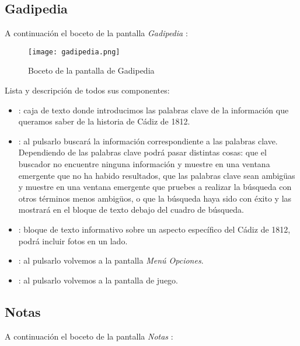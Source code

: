             \newpage
            \subsection{Gadipedia}
            A continuación el boceto de la pantalla \emph{Gadipedia} :
            
            \begin{figure}[H] 
                \begin{center}
                    \texttt{[image: gadipedia.png]}
                \end{center}
                \caption{Boceto de la pantalla de Gadipedia}
                \label{fig:gadipedia}
            \end{figure}
            
            Lista y descripción de todos sus componentes:
            \begin{itemize}
            \item {}: caja de texto donde introducimos las palabras clave de la información que queramos saber de la historia de Cádiz de 1812.
            \item {}: al pulsarlo buscará la información correspondiente a las palabras clave. Dependiendo de las palabras clave podrá pasar distintas cosas: que el buscador no encuentre ninguna información y muestre en una ventana emergente que no ha habido resultados, que las palabras clave sean ambigüas y muestre en una ventana emergente que pruebes a realizar la búsqueda con otros términos menos ambigüos, o que la búsqueda haya sido con éxito y las mostrará en el bloque de texto debajo del cuadro de búsqueda.
            \item {}: bloque de texto informativo sobre un aspecto específico del Cádiz de 1812, podrá incluir fotos en un lado.
            \item {}: al pulsarlo volvemos a la pantalla \emph{Menú Opciones}.
            \item {}: al pulsarlo volvemos a la pantalla de juego.
            \end{itemize}
            
            \newpage
            \subsection{Notas}
            A continuación el boceto de la pantalla \emph{Notas} :
            
